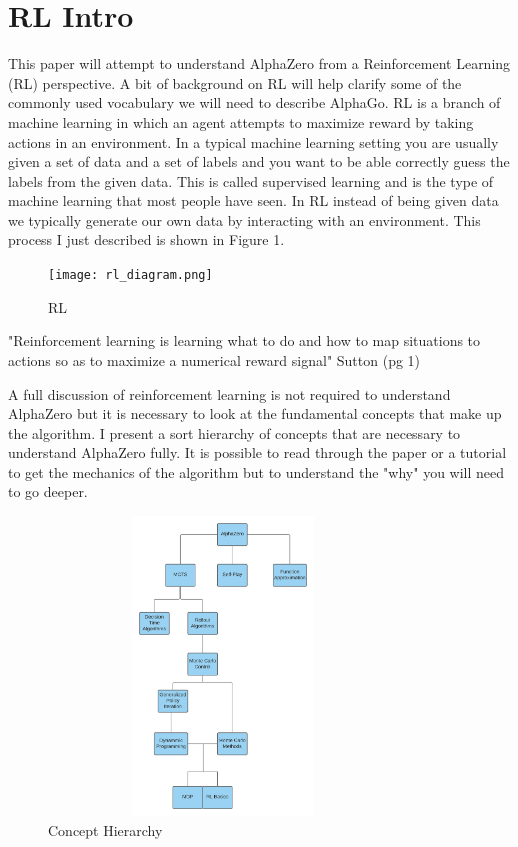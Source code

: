 \section{RL Intro}

This paper will attempt to understand AlphaZero from a Reinforcement Learning (RL) perspective. A bit of background on RL will help clarify some of the commonly used vocabulary we will need to describe AlphaGo. RL is a branch of machine learning in which an agent attempts to maximize reward by taking actions in an environment. In a typical machine learning setting you are usually given a set of data and a set of labels and you want to be able correctly guess the labels from the given data. This is called supervised learning and is the type of machine learning that most people have seen. In RL instead of being given data we typically generate our own data by interacting with an environment. This process I just described is shown in Figure 1. 

    \begin{figure}[H]
        \centering
        \texttt{[image: rl\_diagram.png]}
        \caption{RL}
        \label{fig:my_label}
    \end{figure}


"Reinforcement learning is learning what to do and how to map situations to actions so as to maximize a numerical reward signal" Sutton (pg 1)

A full discussion of reinforcement learning is not required to understand AlphaZero but it is necessary to look at the fundamental concepts that make up the algorithm. I present a sort hierarchy of concepts that are necessary to understand AlphaZero fully. It is possible to read through the paper or a tutorial to get the mechanics of the algorithm but to understand the "why" you will need to go deeper. 

    \begin{figure}[H]
        \centering
        \includegraphics[width=350px,height=300px]{images/alpha_hierarchy.png}
        \caption{Concept Hierarchy}
        \label{fig:my_label}
    \end{figure}
    
